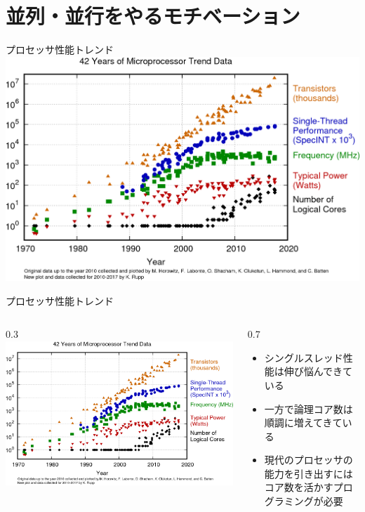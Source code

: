 \documentclass[unicode,12pt]{beamer}
\newlength{\mytotalwidth}
\newlength{\mycolumnwidth}
\begin{document}
\section{並列・並行をやるモチベーション}

\begin{frame}{プロセッサ性能トレンド}
  \includegraphics[width=\textwidth]{pic/42-years-processor-trend.png}
\end{frame}

\begin{frame}{プロセッサ性能トレンド}
  \begin{columns}[totalwidth=\mytotalwidth]
    \begin{column}[T]{0.3\mycolumnwidth}
      \centering
      \includegraphics[width=\columnwidth]{pic/42-years-processor-trend.png}
    \end{column}
    \begin{column}[t]{0.7\mycolumnwidth}
      \begin{itemize}
      \item シングルスレッド性能は伸び悩んできている
      \item 一方で論理コア数は順調に増えてきている
      \item \alert{現代のプロセッサの能力を引き出すにはコア数を活かすプログラミングが必要}
      \end{itemize}
    \end{column}
  \end{columns}
\end{frame}
\end{document}
